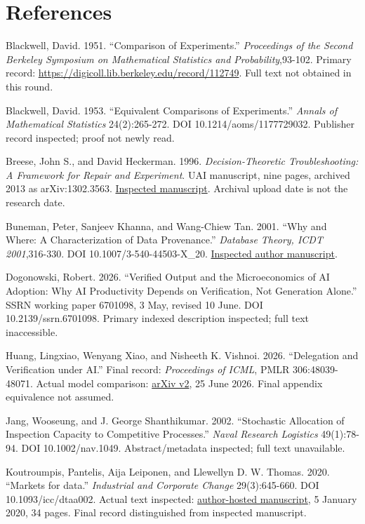 \documentclass[
  11pt,
  a4paper,
]{article}
\begin{document}
{
\small
\setlength{\parindent}{0pt}
\section*{References}\label{references}

Blackwell, David. 1951. ``Comparison of Experiments.'' \emph{Proceedings
of the Second Berkeley Symposium on Mathematical Statistics and
Probability},93-102. Primary record:
\url{https://digicoll.lib.berkeley.edu/record/112749}. Full text not obtained
in this round.

Blackwell, David. 1953. ``Equivalent Comparisons of Experiments.''
\emph{Annals of Mathematical Statistics} 24(2):265-272. DOI
10.1214/aoms/1177729032. Publisher record inspected; proof not newly
read.

Breese, John S., and David Heckerman. 1996. \emph{Decision-Theoretic
Troubleshooting: A Framework for Repair and Experiment}. UAI manuscript,
nine pages, archived 2013 as arXiv:1302.3563.
\href{https://arxiv.org/pdf/1302.3563}{Inspected manuscript}. Archival
upload date is not the research date.

Buneman, Peter, Sanjeev Khanna, and Wang-Chiew Tan. 2001. ``Why and
Where: A Characterization of Data Provenance.'' \emph{Database Theory,
ICDT 2001},316-330. DOI 10.1007/3-540-44503-X\_20.
\href{https://homepages.inf.ed.ac.uk/opb/papers/ICDT2001.pdf}{Inspected
author manuscript}.

Dogonowski, Robert. 2026. ``Verified Output and the Microeconomics of AI
Adoption: Why AI Productivity Depends on Verification, Not Generation
Alone.'' SSRN working paper 6701098, 3 May, revised 10 June. DOI
10.2139/ssrn.6701098. Primary indexed description inspected; full text
inaccessible.

Huang, Lingxiao, Wenyang Xiao, and Nisheeth K. Vishnoi. 2026.
``Delegation and Verification under AI.'' Final record:
\emph{Proceedings of ICML}, PMLR 306:48039-48071. Actual model
comparison: \href{https://arxiv.org/html/2603.02961v2}{arXiv v2}, 25
June 2026. Final appendix equivalence not assumed.

Jang, Wooseung, and J. George Shanthikumar. 2002. ``Stochastic
Allocation of Inspection Capacity to Competitive Processes.''
\emph{Naval Research Logistics} 49(1):78-94. DOI 10.1002/nav.1049.
Abstract/metadata inspected; full text unavailable.

Koutroumpis, Pantelis, Aija Leiponen, and Llewellyn D. W. Thomas. 2020.
``Markets for data.'' \emph{Industrial and Corporate Change}
29(3):645-660. DOI 10.1093/icc/dtaa002. Actual text inspected:
\href{https://www.oxfordmartin.ox.ac.uk/downloads/academic/Data-Marketplaces_ICC-ACC.pdf}{author-hosted
manuscript}, 5 January 2020, 34 pages. Final record distinguished from
inspected manuscript.

}
\end{document}
